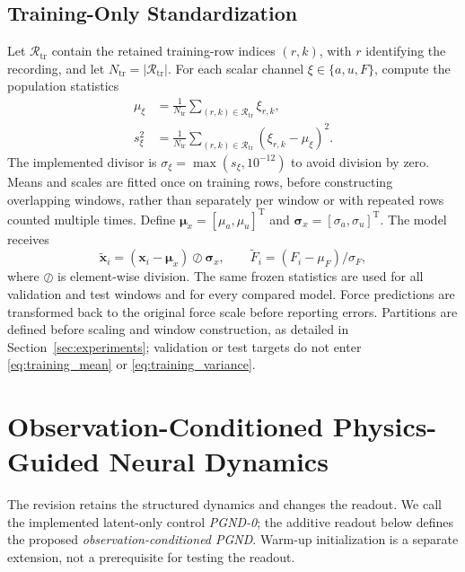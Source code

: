 \documentclass[journal,twoside]{IEEEtran}
\begin{document}
\subsection{Training-Only Standardization}
Let $\mathcal R_{\mathrm{tr}}$ contain the retained training-row indices
$(r,k)$, with $r$ identifying the recording, and let
$N_{\mathrm{tr}}=|\mathcal R_{\mathrm{tr}}|$. For each scalar channel
$\xi\in\{a,u,F\}$, compute the population statistics
\begin{align}
    \mu_\xi&=\frac{1}{N_{\mathrm{tr}}}
        \sum_{(r,k)\in\mathcal R_{\mathrm{tr}}}\xi_{r,k},
        \label{eq:training_mean}\\
    s_\xi^2&=\frac{1}{N_{\mathrm{tr}}}
        \sum_{(r,k)\in\mathcal R_{\mathrm{tr}}}
        (\xi_{r,k}-\mu_\xi)^2.
        \label{eq:training_variance}
\end{align}
The implemented divisor is $\sigma_\xi=\max(s_\xi,10^{-12})$ to avoid
division by zero. Means and scales are fitted once on training rows,
before constructing overlapping windows, rather than separately per
window or with repeated rows counted multiple times. Define
$\bm\mu_x=[\mu_a,\mu_u]^{\mathrm T}$ and
$\bm\sigma_x=[\sigma_a,\sigma_u]^{\mathrm T}$. The model receives
\begin{equation}
    \tilde{\mathbf x}_i=(\mathbf x_i-\bm\mu_x)\oslash\bm\sigma_x,
    \qquad \tilde F_i=(F_i-\mu_F)/\sigma_F,
    \label{eq:standardization}
\end{equation}
where $\oslash$ is element-wise division. The same frozen statistics are
used for all validation and test windows and for every compared model.
Force predictions are transformed back to the original force scale before
reporting errors. Partitions are defined before scaling and window
construction, as detailed in Section~\ref{sec:experiments}; validation or
test targets do not enter \eqref{eq:training_mean} or
\eqref{eq:training_variance}.

\section{Observation-Conditioned Physics-Guided Neural Dynamics}
\label{sec:method}

The revision retains the structured dynamics and changes the readout.
We call the implemented latent-only control \emph{PGND-0}; the additive
readout below defines the proposed \emph{observation-conditioned PGND}.
Warm-up initialization is a separate extension, not a prerequisite for
testing the readout.
\end{document}
